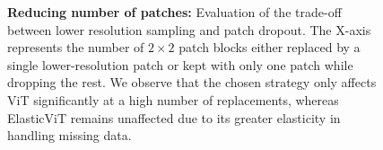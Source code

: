 \begin{figure}[t]
\begin{center}
\begin{small}
\begin{sc}
\begin{center}
\end{center}
\end{sc}
\end{small}
\end{center}
\afterplot
\caption{\textbf{Reducing number of patches:} Evaluation of the trade-off between lower resolution sampling and patch dropout. The X-axis represents the number of $2\times2$ patch blocks either replaced by a single lower-resolution patch or kept with only one patch while dropping the rest. We observe that the chosen strategy only affects ViT significantly at a high number of replacements, whereas ElasticViT remains unaffected due to its greater elasticity in handling missing data.}
\label{fig:drop-vs-rescale-sample}
\end{figure}